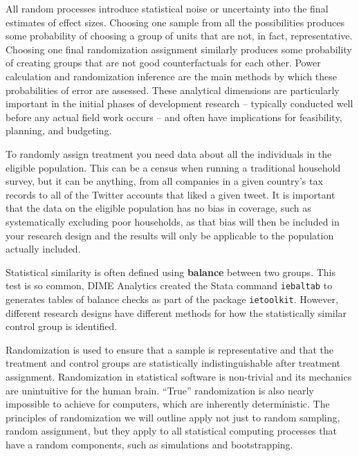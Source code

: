   All random processes introduce statistical noise
	or uncertainty into the final estimates of effect sizes.
	Choosing one sample from all the possibilities produces some probability of
	choosing a group of units that are not, in fact, representative.
	Choosing one final randomization assignment similarly produces some probability of
	creating groups that are not good counterfactuals for each other.
	Power calculation and randomization inference
	are the main methods by which these probabilities of error are assessed.
	These analytical dimensions are particularly important in the initial phases of development research --
	typically conducted well before any actual field work occurs --
	and often have implications for feasibility, planning, and budgeting.

To randomly assign treatment you need data
about all the individuals in the eligible population.
This can be a census when running a traditional household survey,
but it can be anything, from all companies in a given country's tax records
to all of the Twitter accounts that liked a given tweet.
It is important that the data on the eligible population has no bias in coverage,
such as systematically excluding poor households,
as that bias will then be included in your research design
and the results will only be applicable to the population actually included.

Statistical similarity is often defined using \textbf{balance} between two groups.
This test is so common,
DIME Analytics created the Stata command \texttt{iebaltab}
to generates tables of balance checks
as part of the package \texttt{ietoolkit}.
However, different research designs have different methods
for how the statistically similar control group is identified.



Randomization is used to ensure that a sample is representative and
that the treatment and control groups are statistically indistinguishable
after treatment assignment.
Randomization in statistical software is non-trivial
and its mechanics are unintuitive for the human brain.
``True'' randomization is also nearly impossible to achieve for computers,
which are inherently deterministic.
The principles of randomization we will outline
apply not just to random sampling, random assignment,
but they apply to all statistical computing processes that have a random components,
such as simulations and bootstrapping.

